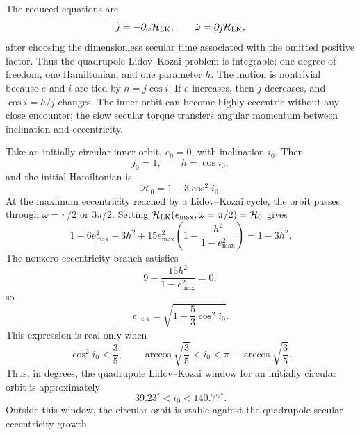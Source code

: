 The reduced equations are
\[
  \dot j=-\partial_\omega\mathcal H_{\rm LK},
  \qquad
  \dot\omega=\partial_j\mathcal H_{\rm LK},
\]
after choosing the dimensionless secular time associated with the omitted
positive factor.  Thus the quadrupole Lidov--Kozai problem is integrable: one
degree of freedom, one Hamiltonian, and one parameter \(h\).  The motion is
nontrivial because \(e\) and \(i\) are tied by \(h=j\cos i\).  If \(e\)
increases, then \(j\) decreases, and \(\cos i=h/j\) changes.  The inner orbit
can become highly eccentric without any close encounter; the slow secular
torque transfers angular momentum between inclination and eccentricity.

\begin{derivation}
Take an initially circular inner orbit, \(e_0=0\), with inclination \(i_0\).
Then
\[
  j_0=1,\qquad h=\cos i_0,
\]
and the initial Hamiltonian is
\[
  \mathcal H_0=1-3\cos^2 i_0.
\]
At the maximum eccentricity reached by a Lidov--Kozai cycle, the orbit passes
through \(\omega=\pi/2\) or \(3\pi/2\).  Setting
\(\mathcal H_{\rm LK}(e_{\max},\omega=\pi/2)=\mathcal H_0\) gives
\[
  1-6e_{\max}^2-3h^2
  +15e_{\max}^2\left(1-\frac{h^2}{1-e_{\max}^2}\right)
  =
  1-3h^2 .
\]
The nonzero-eccentricity branch satisfies
\[
  9-\frac{15h^2}{1-e_{\max}^2}=0,
\]
so
\[
  \boxed{
  e_{\max}
  =
  \sqrt{1-\frac{5}{3}\cos^2 i_0}.
  }
\]
This expression is real only when
\[
  \cos^2 i_0<\frac35,
  \qquad
  \arccos\sqrt{\frac35}<i_0<\pi-\arccos\sqrt{\frac35}.
\]
Thus, in degrees, the quadrupole Lidov--Kozai window for an initially circular
orbit is approximately
\[
  39.23^\circ<i_0<140.77^\circ .
\]
Outside this window, the circular orbit is stable against the quadrupole secular
eccentricity growth.
\end{derivation}

